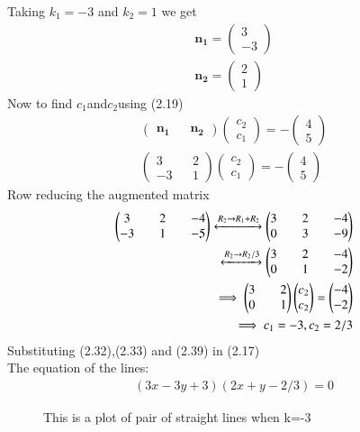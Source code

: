 \documentclass[journal,13pt,twocolumn]{IEEEtran}
\newcommand{\myvec}[1]{\ensuremath{\begin{pmatrix}#1\end{pmatrix}}}
\renewcommand{\vec}[1]{\mathbf{#1}}
\begin{document}
Taking $k_1 = -3$ and $k_2 = 1$ we get
\begin{align}
\vec{n_1} = \myvec{3 \\ -3}\\
\vec{n_2} = \myvec{2 \\ 1}
\end{align}
Now to find $ c_1 $and$ c_2 $using (2.19) 
\begin{align}
\myvec{\vec{n_1} && \vec{n_2}} \myvec{c_2 \\ c_1} = -\myvec{4 \\ 5}\\
\myvec{3 && 2\\ -3 && 1}\myvec{c_2 \\ c_1} = -\myvec{4 \\ 5}
\end{align}
Row reducing the augmented matrix
\begin{align}
\myvec{3 && 2 && -4\\ -3 && 1 && -5} \xleftrightarrow[]{R_2\rightarrow R_1+R_2}\myvec{3 && 2 && -4\\ 0 && 3 && -9}\\
\xleftrightarrow[]{R_2\rightarrow R_2/3}\myvec{3 && 2 && -4\\ 0 && 1 && -2}\\
\implies \myvec{3 && 2\\ 0 && 1}\myvec{c_2 \\ c_2} = \myvec{-4 \\ -2}\\
\implies c_1 = -3 , c_2 = 2/3
\end{align}
Substituting (2.32),(2.33) and (2.39) in (2.17)\\
The equation of the lines:
\begin{align}
\boxed{(3x - 3y + 3)(2x + y - 2/3) = 0}
\end{align}
\begin{figure}
   \centering
   \caption{This is a plot of pair of straight lines when k=-3}
   \end{figure}
\end{document}
